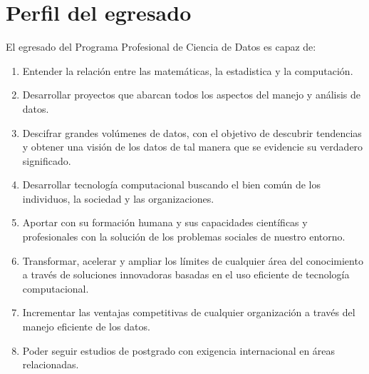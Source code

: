 \section{Perfil del egresado}

El egresado del Programa Profesional de Ciencia de Datos es capaz de:
\begin{enumerate}
\item Entender la relación entre las matemáticas, la estadistica y la computación.
\item Desarrollar proyectos que abarcan todos los aspectos del manejo y análisis de datos.
\item Descifrar grandes volúmenes de datos, con el objetivo de descubrir tendencias y obtener una visión de los datos de tal manera que se evidencie su verdadero significado.
\item Desarrollar tecnología computacional buscando el bien común de los individuos, la sociedad y las organizaciones.
\item Aportar con su formación humana y sus capacidades científicas y profesionales con la solución de los problemas sociales de nuestro entorno.
\item Transformar, acelerar y ampliar los límites de cualquier área del conocimiento a través de soluciones innovadoras basadas en el uso eficiente de tecnología computacional.
\item Incrementar las ventajas competitivas de cualquier organización a través del manejo eficiente de los datos.
\item Poder seguir estudios de postgrado con exigencia internacional en áreas relacionadas.
\end{enumerate}
